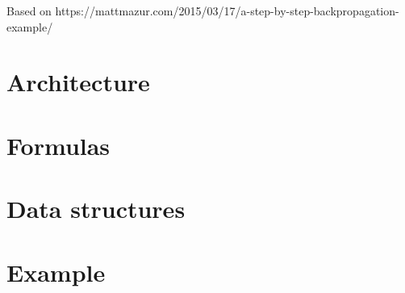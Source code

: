 \documentclass{article}
\begin{document}
    \title{}
    \author{}
    \date{}

    Based on https://mattmazur.com/2015/03/17/a-step-by-step-backpropagation-example/

    \section{Architecture}

    

    \section{Formulas}
    
    

    \section{Data structures}

    

    \section{Example}

    
\end{document}
